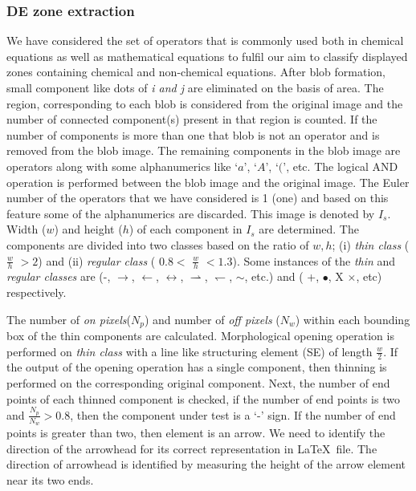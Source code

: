 \documentclass[conference]{IEEEtran}
\begin{document}
\subsubsection{DE zone extraction} 
\label{DEZONE}
We have considered the set of operators that is commonly used both in chemical equations as well as mathematical equations to fulfil our aim to classify displayed zones containing chemical and non-chemical equations. After blob formation, small component like dots of \emph{i and j} are eliminated on the basis of area. The region, corresponding to each blob is considered from the original image and the
number of connected component(s) present in that region is counted. If the number of components is more than one that blob is not an operator and is removed from the  blob image.
The remaining components in the blob image are operators along with some alphanumerics like $‘a’$, $‘A’$, $‘(’$, etc. The logical AND operation is performed between the blob image and the original image. The Euler number of the operators that we have considered is 1 (one) and based on this feature some of the alphanumerics are discarded. This image is denoted by $I_s$.
Width ($w$) and height ($h$) of each component in $I_s$ are determined. The components  are divided into two classes based on the ratio of $w, h$;
(i) {\em thin class} ($\frac{w}{h}$ $> 2$) and (ii) {\em regular class} ( $0.8 <$ $\frac{w}{h}$ $< 1.3$). 
Some instances of the \emph{thin}  and \emph{regular classes} are (-,  $\rightarrow$, $\leftarrow$, $\leftrightarrow$,  $\rightharpoonup$, $\leftharpoondown$, $\sim$, etc.) and  ( +, $\bullet$, X $\times$, etc) respectively. 

The number of \emph{on pixels}($N_p$) and number of \emph{off pixels} ($N_w$) within each bounding box of the thin components are calculated. 
Morphological opening operation is performed on {\em thin class} with a line like structuring element (SE) of length $\frac{w}{2}$.
If the output of the opening operation has a single component, then  thinning is performed on the corresponding original component.
Next, the number of end points of each thinned component is checked, if the number of end points is two  and $\frac{N_p}{N_w} > 0.8$, then the component under test is a `-' sign. If the number of end points is greater than two, then  element is an arrow. We need to identify the direction of the arrowhead for its correct representation in  \LaTeX\ file. The direction of arrowhead is identified by measuring the height of the arrow element near its two ends. 
\end{document}
